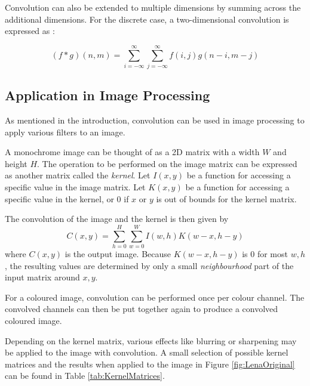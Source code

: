 Convolution can also be extended to multiple dimensions by summing across the additional dimensions.
For the discrete case, a two-dimensional convolution is expressed as \cite{convolution2}:

\[
    (f * g)(n, m) = \sum^{\infty}_{i=-\infty}\sum^{\infty}_{j=-\infty}{f(i, j)g(n-i, m-j)}
\]

\subsection{Application in Image Processing}
As mentioned in the introduction, convolution can be used in image processing to apply various filters to an image.

A monochrome image can be thought of as a 2D matrix with a width $W$ and height $H$.
The operation to be performed on the image matrix can be expressed as another matrix called the \textit{kernel}.
Let $I(x, y)$ be a function for accessing a specific value in the image matrix.
Let $K(x, y)$ be a function for accessing a specific value in the kernel,
or $0$ if $x$ or $y$ is out of bounds for the kernel matrix.

The convolution of the image and the kernel is then given by
\[
    C(x, y) = \sum^{H}_{h=0} \sum^{W}_{w=0}{I(w, h)K(w - x, h - y)}
\]
where $C(x, y)$ is the output image.
Because $K(w - x, h - y)$ is $0$ for most $w, h$, the resulting values are determined by only a small \textit{neighbourhood} part of the input matrix around $x, y$.

For a coloured image, convolution can be performed once per colour channel. The convolved channels can then be put together again to produce a convolved coloured image.

Depending on the kernel matrix, various effects like blurring or sharpening may be applied to the image with convolution.
A small selection of possible kernel matrices and the results when applied to the image in Figure \ref{fig:LenaOriginal} can be found in Table \ref{tab:KernelMatrices}.

